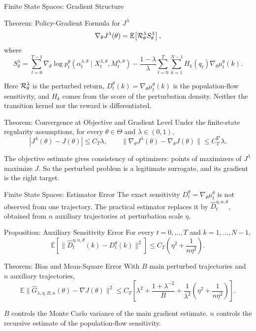 \documentclass[9pt]{beamer}
\def\Rc{{\cal R}}
\def\E{{\mathbb E}}
\begin{document}
\begin{frame}{Finite State Spaces: Gradient Structure}
\small
\begin{block}{Theorem: Policy-Gradient Formula for $J^\lambda$}
\[
  \nabla_\theta J^\lambda(\theta)
  =
  \E\!\left[\Rc_\theta^\lambda S_\theta^\lambda\right],
\]
where
\[
  S_\theta^\lambda
  =
  \sum_{t=0}^{T-1}
  \nabla_\theta\log p_t^\theta(
    \alpha_t^{\lambda,\theta}
    \mid X_t^{\lambda,\theta},M_t^{\lambda,\theta})
  -
  \frac{1-\lambda}{\lambda}
  \sum_{t=0}^{T}\sum_{k=1}^{N-1}
  H_k(q_t)\nabla_\theta\mu_t^\theta(k).
\]
\end{block}

\vspace{0.1cm}
Here $\Rc_\theta^\lambda$ is the perturbed return, $D_t^\theta(k)=\nabla_\theta\mu_t^\theta(k)$ is the population-flow sensitivity, and $H_k$ comes from the score of the perturbation density. Neither the transition kernel nor the reward is differentiated.

\vspace{0.15cm}
\begin{block}{Theorem: Convergence at Objective and Gradient Level}
Under the finite-state regularity assumptions, for every $\theta\in\Theta$ and $\lambda\in(0,1)$,
\[
  |J^\lambda(\theta)-J(\theta)|\leq C_T\lambda,
  \qquad
  \|\nabla_\theta J^\lambda(\theta)-\nabla_\theta J(\theta)\|\leq C_T^\nabla\lambda .
\]
\end{block}

\vspace{0.05cm}
The objective estimate gives consistency of optimizers: points of maximizers of $J^\lambda$ maximize $J$. So the perturbed problem is a legitimate surrogate, and its gradient is the right target.
\end{frame}

\begin{frame}{Finite State Spaces: Estimator Error}
\small
The exact sensitivity $D_t^\theta=\nabla_\theta\mu_t^\theta$ is not observed from one trajectory. The practical estimator replaces it by $\widehat D_t^{\eta,n,\theta}$, obtained from $n$ auxiliary trajectories at perturbation scale $\eta$.

\begin{block}{Proposition: Auxiliary Sensitivity Error}
For every $t=0,\ldots,T$ and $k=1,\ldots,N-1$,
\[
  \E\!\left[
  \|\widehat D_t^{\eta,n,\theta}(k)-D_t^\theta(k)\|^2
  \right]
  \leq C_T\left(\eta^2+\frac{1}{n\eta^2}\right).
\]
\end{block}

\begin{block}{Theorem: Bias and Mean-Square Error}
With $B$ main perturbed trajectories and $n$ auxiliary trajectories,
\[
  \E\|\widehat G_{\lambda,\eta,B,n}(\theta)-\nabla J(\theta)\|^2
  \leq C_T\left[
  \lambda^2
  +
  \frac{1+\lambda^{-2}}{B}
  +
  \frac1{\lambda^2}\left(\eta^2+\frac{1}{n\eta^2}\right)
  \right].
\]
\end{block}

$B$ controls the Monte Carlo variance of the main gradient estimate. $n$ controls the recursive estimate of the population-flow sensitivity.
\end{frame}
\end{document}
